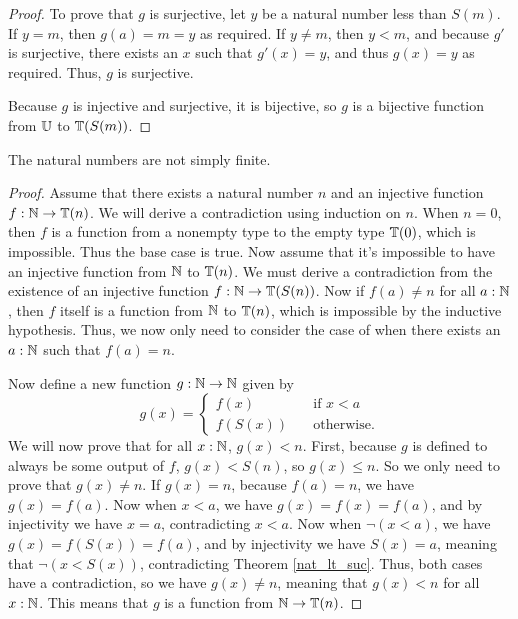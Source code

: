 \documentclass[../../math.tex]{subfiles}
\begin{document}
\begin{proof}
    To prove that $g$ is surjective, let $y$ be a natural number less than
    $S(m)$.  If $y = m$, then $g(a) = m = y$ as required.  If $y \neq m$, then
    $y < m$, and because $g'$ is surjective, there exists an $x$ such that
    $g'(x) = y$, and thus $g(x) = y$ as required.  Thus, $g$ is surjective.

    Because $g$ is injective and surjective, it is bijective, so $g$ is a
    bijective function from $\mathbb{U}$ to $\mathbb{T}(S(m))$.
\end{proof}

\begin{theorem} \label{nat_not_finite}
    The natural numbers are not simply finite.
\end{theorem}
\begin{proof}
    Assume that there exists a natural number $n$ and an injective function $f :
    \mathbb{N} \to \mathbb{T}(n)$.  We will derive a contradiction using induction on $n$.  When
    $n = 0$, then $f$ is a function from a nonempty type to the empty type
    $\mathbb{T}(0)$, which is impossible.  Thus the base case is true.  Now assume that
    it's impossible to have an injective function from $\mathbb{N}$ to $\mathbb{T}(n)$.  We must
    derive a contradiction from the existence of an injective function $f : \mathbb{N}
    \to \mathbb{T}(S(n))$.  Now if $f(a) \neq n$ for all $a : \mathbb{N}$, then $f$ itself is a
    function from $\mathbb{N}$ to $\mathbb{T}(n)$, which is impossible by the inductive
    hypothesis.  Thus, we now only need to consider the case of when there
    exists an $a : \mathbb{N}$ such that $f(a) = n$.

    Now define a new function $g : \mathbb{N} \to \mathbb{N}$ given by
    \[
        g(x) = \begin{cases}
            f(x) \quad &\text{if $x < a$} \\
            f(S(x)) \quad &\text{otherwise.}
        \end{cases}
    \]
    We will now prove that for all $x : \mathbb{N}$, $g(x) < n$.  First, because $g$ is
    defined to always be some output of $f$, $g(x) < S(n)$, so $g(x) \leq n$.
    So we only need to prove that $g(x) \neq n$.  If $g(x) = n$, because $f(a) =
    n$, we have $g(x) = f(a)$.  Now when $x < a$, we have $g(x) = f(x) = f(a)$,
    and by injectivity we have $x = a$, contradicting $x < a$.  Now when $\neg(x
    < a)$, we have $g(x) = f(S(x)) = f(a)$, and by injectivity we have $S(x) =
    a$, meaning that $\neg(x < S(x))$, contradicting Theorem \ref{nat_lt_suc}.
    Thus, both cases have a contradiction, so we have $g(x) \neq n$, meaning
    that $g(x) < n$ for all $x : \mathbb{N}$.  This means that $g$ is a function from
    $\mathbb{N} \to \mathbb{T}(n)$.


\end{proof}
\end{document}

